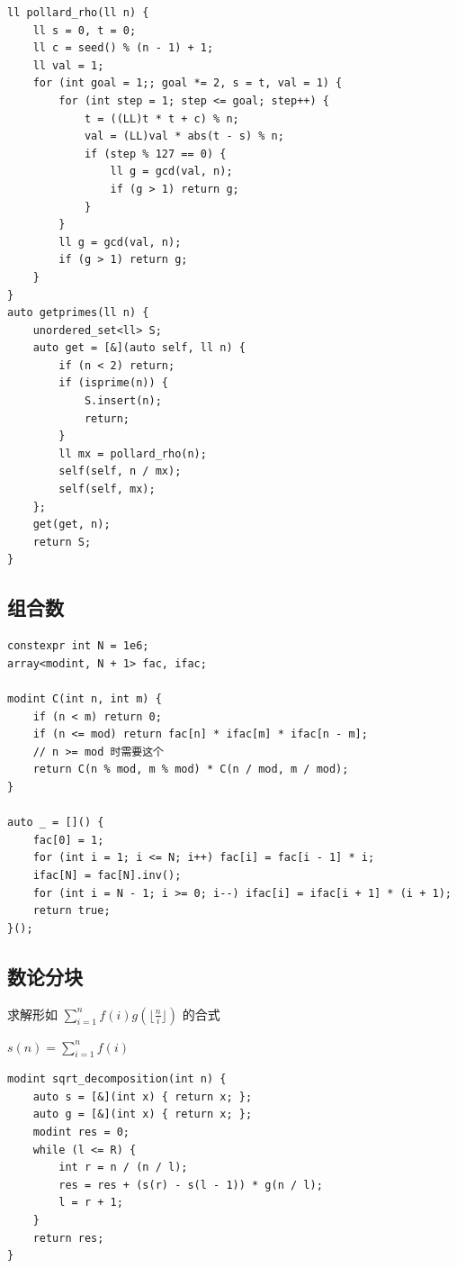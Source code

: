 \documentclass[UTF8]{ctexart}
\begin{document}
\begin{sloppypar}
\begin{lstlisting}[style=cpp]
ll pollard_rho(ll n) {
    ll s = 0, t = 0;
    ll c = seed() % (n - 1) + 1;
    ll val = 1;
    for (int goal = 1;; goal *= 2, s = t, val = 1) {
        for (int step = 1; step <= goal; step++) {
            t = ((LL)t * t + c) % n;
            val = (LL)val * abs(t - s) % n;
            if (step % 127 == 0) {
                ll g = gcd(val, n);
                if (g > 1) return g;
            }
        }
        ll g = gcd(val, n);
        if (g > 1) return g;
    }
}
auto getprimes(ll n) {
    unordered_set<ll> S;
    auto get = [&](auto self, ll n) {
        if (n < 2) return;
        if (isprime(n)) {
            S.insert(n);
            return;
        }
        ll mx = pollard_rho(n);
        self(self, n / mx);
        self(self, mx);
    };
    get(get, n);
    return S;
}
\end{lstlisting}

\subsection{组合数}

\begin{lstlisting}[style=cpp]
constexpr int N = 1e6;
array<modint, N + 1> fac, ifac;

modint C(int n, int m) {
    if (n < m) return 0;
    if (n <= mod) return fac[n] * ifac[m] * ifac[n - m];
    // n >= mod 时需要这个
    return C(n % mod, m % mod) * C(n / mod, m / mod);
}

auto _ = []() {
    fac[0] = 1;
    for (int i = 1; i <= N; i++) fac[i] = fac[i - 1] * i;
    ifac[N] = fac[N].inv();
    for (int i = N - 1; i >= 0; i--) ifac[i] = ifac[i + 1] * (i + 1);
    return true;
}();
\end{lstlisting}

\subsection{数论分块}

求解形如 $\sum_{i=1}^{n}f(i)g(\lfloor\frac{n}{i}\rfloor)$ 的合式

$s(n) = \sum_{i=1}^{n}f(i)$

\begin{lstlisting}[style=cpp]
modint sqrt_decomposition(int n) {
    auto s = [&](int x) { return x; };
    auto g = [&](int x) { return x; };
    modint res = 0;
    while (l <= R) {
        int r = n / (n / l);
        res = res + (s(r) - s(l - 1)) * g(n / l);
        l = r + 1;
    }
    return res;
}
\end{lstlisting}


\end{sloppypar}
\end{document}
